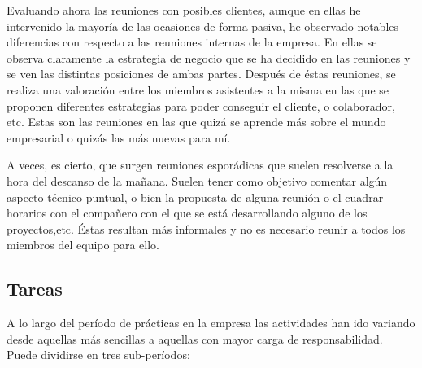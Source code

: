 			Evaluando ahora las reuniones con posibles clientes, aunque en ellas he intervenido la mayoría de las ocasiones de forma pasiva, he observado notables diferencias con respecto a las reuniones internas de la empresa. En ellas se observa claramente la estrategia de negocio que se ha decidido en las reuniones y se ven las distintas posiciones de ambas partes. Después de éstas reuniones, se realiza una valoración entre los miembros asistentes a la misma en las que se proponen diferentes estrategias para poder conseguir el cliente, o colaborador, etc. Estas son las reuniones en las que quizá se aprende más sobre el mundo empresarial o quizás las más nuevas para mí.
			
			A veces, es cierto, que surgen reuniones esporádicas que suelen resolverse a la hora del descanso de la mañana. Suelen tener como objetivo comentar algún aspecto técnico puntual, o bien la propuesta de alguna reunión o el cuadrar horarios con el compañero con el que se está desarrollando alguno de los proyectos,etc. Éstas resultan más informales y no es necesario reunir a todos los miembros del equipo para ello.
			
		\subsection{Tareas}
					
			A lo largo del período de prácticas en la empresa las actividades han ido variando desde aquellas más sencillas a aquellas con mayor carga de responsabilidad. Puede dividirse en tres sub-períodos:
			
